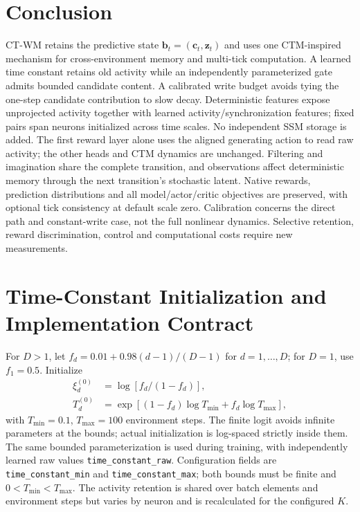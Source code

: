 \documentclass{article}
\begin{document}
\section{Conclusion}

CT-WM retains the predictive state $\mathbf b_t=(\mathbf c_t,\mathbf z_t)$ and uses one CTM-inspired mechanism for cross-environment memory and multi-tick computation. A learned time constant retains old activity while an independently parameterized gate admits bounded candidate content. A calibrated write budget avoids tying the one-step candidate contribution to slow decay. Deterministic features expose unprojected activity together with learned activity/synchronization features; fixed pairs span neurons initialized across time scales. No independent SSM storage is added. The first reward layer alone uses the aligned generating action to read raw activity; the other heads and CTM dynamics are unchanged. Filtering and imagination share the complete transition, and observations affect deterministic memory through the next transition's stochastic latent. Native rewards, prediction distributions and all model/actor/critic objectives are preserved, with optional tick consistency at default scale zero. Calibration concerns the direct path and constant-write case, not the full nonlinear dynamics. Selective retention, reward discrimination, control and computational costs require new measurements.



\clearpage
\appendix
\section{Time-Constant Initialization and Implementation Contract}
\label{app:timescale_details}

For $D>1$, let $f_d=0.01+0.98(d-1)/(D-1)$ for $d=1,\ldots,D$; for $D=1$, use $f_1=0.5$. Initialize
\begin{equation}
\begin{aligned}
\xi_d^{(0)}&=\log[f_d/(1-f_d)],\\
T_d^{(0)}&=\exp[(1-f_d)\log T_{\min}+f_d\log T_{\max}],
\end{aligned}
\label{eq:ct_time_initialization}
\end{equation}
with $T_{\min}=0.1$, $T_{\max}=100$ environment steps. The finite logit avoids infinite parameters at the bounds; actual initialization is log-spaced strictly inside them. The same bounded parameterization is used during training, with independently learned raw values \texttt{time\_constant\_raw}. Configuration fields are \texttt{time\_constant\_min} and \texttt{time\_constant\_max}; both bounds must be finite and $0<T_{\min}<T_{\max}$. The activity retention is shared over batch elements and environment steps but varies by neuron and is recalculated for the configured $K$.
\end{document}
